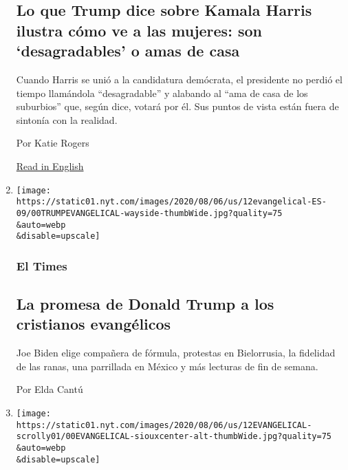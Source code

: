 \begin{enumerate}
  \hypertarget{lo-que-trump-dice-sobre-kamala-harris-ilustra-cuxf3mo-ve-a-las-mujeres-son-desagradables-o-amas-de-casa-1}{%
  \subsection{Lo que Trump dice sobre Kamala Harris ilustra cómo ve a
  las mujeres: son `desagradables' o amas de
  casa}\label{lo-que-trump-dice-sobre-kamala-harris-ilustra-cuxf3mo-ve-a-las-mujeres-son-desagradables-o-amas-de-casa-1}}

  Cuando Harris se unió a la candidatura demócrata, el presidente no
  perdió el tiempo llamándola ``desagradable'' y alabando al ``ama de
  casa de los suburbios'' que, según dice, votará por él. Sus puntos de
  vista están fuera de sintonía con la realidad.

  Por Katie Rogers

  \href{https://www.nytimes.com/2020/08/12/us/politics/trump-women-kamala-harris.html}{Read
  in English}
\item
  \href{/es/2020/08/14/espanol/Kamala-Harris-Trump-evangelicos.html}{}

  \texttt{[image: https://static01.nyt.com/images/2020/08/06/us/12evangelical-ES-09/00TRUMPEVANGELICAL-wayside-thumbWide.jpg?quality=75\\\&auto=webp\\\&disable=upscale]}

  \hypertarget{el-times}{%
  \subsubsection{El Times}\label{el-times}}

  \hypertarget{la-promesa-de-donald-trump-a-los-cristianos-evanguxe9licos}{%
  \subsection{La promesa de Donald Trump a los cristianos
  evangélicos}\label{la-promesa-de-donald-trump-a-los-cristianos-evanguxe9licos}}

  Joe Biden elige compañera de fórmula, protestas en Bielorrusia, la
  fidelidad de las ranas, una parrillada en México y más lecturas de fin
  de semana.

  Por Elda Cantú
\item
  \href{/es/2020/08/13/espanol/estados-unidos/trump-cristianos-evangelicos.html}{}

  \texttt{[image: https://static01.nyt.com/images/2020/08/06/us/12EVANGELICAL-scrolly01/00EVANGELICAL-siouxcenter-alt-thumbWide.jpg?quality=75\\\&auto=webp\\\&disable=upscale]}


\end{enumerate}
